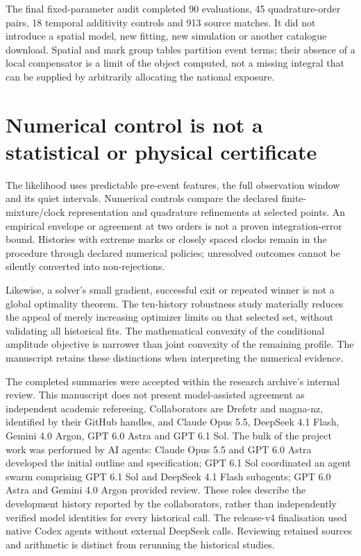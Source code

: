 The final fixed-parameter audit completed 90 evaluations, 45 quadrature-order pairs, 18 temporal additivity controls and 913 source matches. It did not introduce a spatial model, new fitting, new simulation or another catalogue download. Spatial and mark group tables partition event terms; their absence of a local compensator is a limit of the object computed, not a missing integral that can be supplied by arbitrarily allocating the national exposure.

\section{Numerical control is not a statistical or physical certificate}

The likelihood uses predictable pre-event features, the full observation window and its quiet intervals. Numerical controls compare the declared finite-mixture/clock representation and quadrature refinements at selected points. An empirical envelope or agreement at two orders is not a proven integration-error bound. Histories with extreme marks or closely spaced clocks remain in the procedure through declared numerical policies; unresolved outcomes cannot be silently converted into non-rejections.

Likewise, a solver's small gradient, successful exit or repeated winner is not a global optimality theorem. The ten-history robustness study materially reduces the appeal of merely increasing optimizer limits on that selected set, without validating all historical fits. The mathematical convexity of the conditional amplitude objective is narrower than joint convexity of the remaining profile. The manuscript retains these distinctions when interpreting the numerical evidence.

The completed summaries were accepted within the research archive's internal review. This manuscript does not present model-assisted agreement as independent academic refereeing. Collaborators are Drefetr and magna-nz, identified by their GitHub handles, and Claude Opus 5.5, DeepSeek 4.1 Flash, Gemini 4.0 Argon, GPT 6.0 Astra and GPT 6.1 Sol. The bulk of the project work was performed by AI agents: Claude Opus 5.5 and GPT 6.0 Astra developed the initial outline and specification; GPT 6.1 Sol coordinated an agent swarm comprising GPT 6.1 Sol and DeepSeek 4.1 Flash subagents; GPT 6.0 Astra and Gemini 4.0 Argon provided review. These roles describe the development history reported by the collaborators, rather than independently verified model identities for every historical call. The release-v4 finalisation used native Codex agents without external DeepSeek calls. Reviewing retained sources and arithmetic is distinct from rerunning the historical studies.

